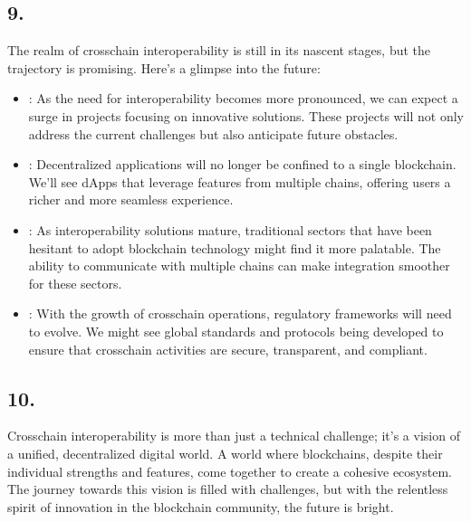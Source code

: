 \documentclass[letterpaper,10pt,english]{jupyterBook}
\begin{document}
\subsection{9. }
\label{\detokenize{Interoperability/Cross-Chain Interoperability:future-prospects-and-developments}}
\sphinxAtStartPar
The realm of cross\sphinxhyphen{}chain interoperability is still in its nascent stages, but the trajectory is promising. Here’s a glimpse into the future:
\begin{itemize}
\item {} 
\sphinxAtStartPar
{}: As the need for interoperability becomes more pronounced, we can expect a surge in projects focusing on innovative solutions. These projects will not only address the current challenges but also anticipate future obstacles.

\item {} 
\sphinxAtStartPar
{}: Decentralized applications will no longer be confined to a single blockchain. We’ll see dApps that leverage features from multiple chains, offering users a richer and more seamless experience.

\item {} 
\sphinxAtStartPar
{}: As interoperability solutions mature, traditional sectors that have been hesitant to adopt blockchain technology might find it more palatable. The ability to communicate with multiple chains can make integration smoother for these sectors.

\item {} 
\sphinxAtStartPar
{}: With the growth of cross\sphinxhyphen{}chain operations, regulatory frameworks will need to evolve. We might see global standards and protocols being developed to ensure that cross\sphinxhyphen{}chain activities are secure, transparent, and compliant.

\end{itemize}


\subsection{10. }
\label{\detokenize{Interoperability/Cross-Chain Interoperability:conclusion}}
\sphinxAtStartPar
Cross\sphinxhyphen{}chain interoperability is more than just a technical challenge; it’s a vision of a unified, decentralized digital world. A world where blockchains, despite their individual strengths and features, come together to create a cohesive ecosystem. The journey towards this vision is filled with challenges, but with the relentless spirit of innovation in the blockchain community, the future is bright.
\end{document}
